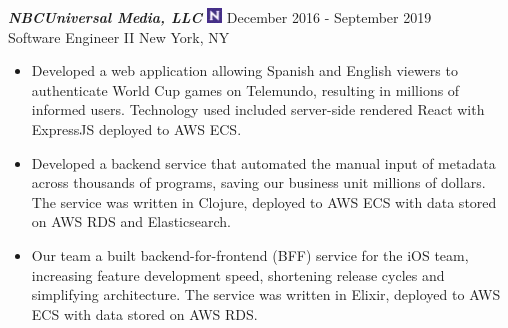 {\sl \textbf{NBCUniversal Media, LLC} \includegraphics[width=0.4cm]{./images/nbcuniversal.jpg}} \hfill December 2016 - September 2019 \\ Software Engineer II \hfill New York, NY
\begin{itemize}
    \item Developed a web application allowing Spanish and English viewers to authenticate World Cup games on Telemundo, resulting in millions of informed users. Technology used included server-side rendered React with ExpressJS deployed to AWS ECS.
    \item Developed a backend service that automated the manual input of metadata across thousands of programs, saving our business unit millions of dollars. The service was written in Clojure, deployed to AWS ECS with data stored on AWS RDS and Elasticsearch.
    \item Our team a built backend-for-frontend (BFF) service for the iOS team, increasing feature development speed, shortening release cycles and simplifying architecture. The service was written in Elixir, deployed to AWS ECS with data stored on AWS RDS.
\end{itemize}
